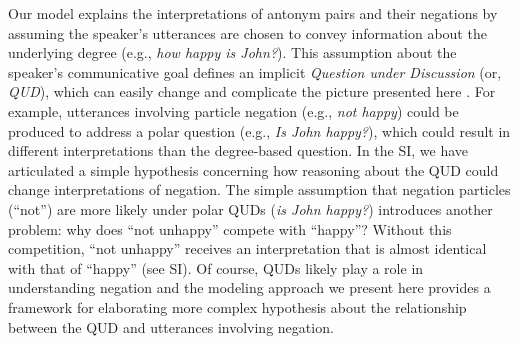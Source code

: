 \documentclass[floatsintext,doc]{apa6}
\begin{document}
Our model explains the interpretations of antonym pairs and their negations by assuming the speaker's utterances are chosen to convey information about the underlying degree (e.g., \emph{how happy is John?}). This assumption about the speaker's communicative goal defines an implicit \emph{Question under Discussion} (or, \emph{QUD}), which can easily change and complicate the picture presented here  \cite{roberts2012information, beaver2017questions}. For example, utterances involving particle negation (e.g., \emph{not happy}) could be produced to address a polar question (e.g., \emph{Is John happy?}), which could result in different interpretations than the degree-based question. 
In the SI, we have articulated a simple hypothesis concerning how reasoning about the QUD could change interpretations of negation. 
The simple assumption that negation particles (``not'') are more likely under polar QUDs (\emph{is John happy?}) introduces another problem: why does ``not unhappy'' compete with ``happy''? Without this competition,  ``not unhappy'' receives an interpretation that is almost identical with that of ``happy'' (see SI).
Of course, QUDs likely play a role in understanding negation and the modeling approach we present here provides a framework for elaborating more complex hypothesis about the relationship between the QUD and utterances involving negation.

%
\end{document}
